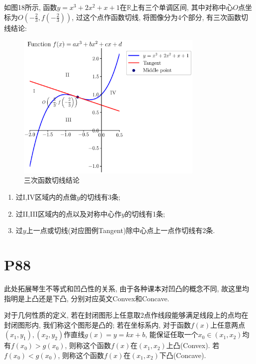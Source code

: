 \documentclass{book}
\begin{document}
    如图18所示, 函数$y=x^3+2x^2+x+1$在$\mathbb{R}$上有三个单调区间, 其中对称中心$O$点坐标为$\displaystyle O\left ( -\frac{2}{3},f\left ( -\frac{2}{3} \right )  \right ) $, 过这个点作函数切线, 将图像分为4个部分, 有三次函数切线结论:

    \begin{figure}[htbp]
        \centering
        \includegraphics[width=0.8\textwidth]{img/CubicFunction.eps}
        \caption{三次函数切线结论}
    \end{figure}

    \begin{enumerate}
        \item 过I,IV区域内的点做$y$的切线有3条;
        \item 过II,III区域内的点以及对称中心作$y$的切线有1条;
        \item 过$y$上一点或切线(对应图例Tangent)除中心点上一点作切线有2条.
    \end{enumerate}

    \section{\textcolor[rgb]{0.11,0.65,0.52}{P88}}

    此处拓展\textcolor[rgb]{0.38,0.11,0.2}{琴生不等式}和\textcolor[rgb]{0.38,0.11,0.2}{凹凸性}的关系, 由于各种课本对凹凸的概念不同, 故这里均指明是上凸还是下凸, 分别对应英文Convex和Concave.

    对于几何性质的定义, 若在封闭图形上任意取2点作线段能够满足线段上的点均在封闭图形内, 我们称这个图形是凸的; 若在坐标系内, 对于函数$f(x)$上任意两点$(x_1,y_1),(x_2,y_2)$作直线$g(x)=y=kx+b$, 能保证任取一个$x_0\in \left( x_1,x_2 \right)$均有$f(x_0)>g(x_0)$, 则称这个函数$f(x)$在$\left( x_1,x_2 \right)$上凸(Convex). 若$f(x_0)<g(x_0)$, 则称这个函数$f(x)$在$\left( x_1,x_2 \right)$下凸(Concave).
    
\end{document}
